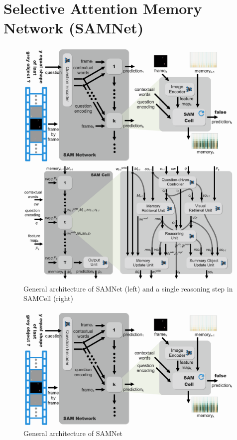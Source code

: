 \section{Selective Attention Memory Network (SAMNet)}

\begin{figure}[!b]
\begin{minipage}{0.43\textwidth}
	\centering
	\includegraphics[width=\textwidth]{../img/architecture/samnet_architecture4}
\end{minipage}\hfill
\begin{minipage}{0.55\textwidth}
	\centering
	\includegraphics[width=\textwidth]{../img/architecture/samcell_reasoning}
\end{minipage}\hfill
\caption{General architecture of SAMNet (left) and a single reasoning step in SAMCell (right)}
\label{fig:samnet}
\end{figure}	

\begin{figure}[!t]
	\centering
	\includegraphics[width=\textwidth]{../img/architecture/samnet_architecture4}
	\caption{General architecture of SAMNet}
	\label{fig:samneta}
\end{figure}	

